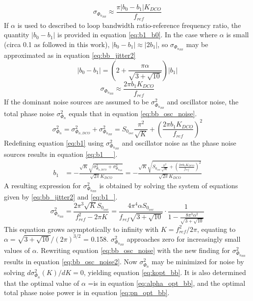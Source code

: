 		\begin{equation}\label{eq:bb_jitter}
			\sigma_{\Phi_{n_{BB}}} \approx \frac{\pi|b_0-b_1|K_{DCO}}{f_{ref}}
		\end{equation}
	If $\alpha$ is used to described to loop bandwidth ratio-reference frequency ratio, the quantity $|b_0-b_1|$ is provided in equation \ref{eq:b1_b0}. In the case where $\alpha$ is small (circa 0.1 as followed in this work), $|b_0-b_1| \approx |2b_1|$, so $\sigma_{\Phi_{n_{BB}}}$ may be approximated as in equation \ref{eq:bb_jitter2}
	\begin{equation}\label{eq:b1_b0}
			|b_0-b_1| = \left(2 + \frac{\pi \alpha}{\sqrt{3+\sqrt{10}}}\right)|b_1|
	\end{equation}
	\begin{equation}\label{eq:bb_jitter2}
		\sigma_{\Phi_{n_{BB}}} \approx \frac{2\pi b_1K_{DCO}}{f_{ref}}
	\end{equation}	
	If the dominant noise sources are assumed to be $\sigma^2_{\Phi_{n_{BB}}}$ and oscillator noise, the total phase noise $\sigma^2_{\Phi_{n}}$ equals that in equation \ref{eq:bb_osc_noise}.
	\begin{equation}\label{eq:bb_osc_noise}
		\sigma_{\Phi_{n}}^2 = \sigma_{\Phi_{n,DCO}}^2 + \sigma^2_{\Phi_{n_{BB}}} = S_{0_{osc}}\frac{\pi^2}{\sqrt{K}} + \left( \frac{2\pi b_1K_{DCO}}{f_{ref}} \right)^2
	\end{equation}
	Redefining equation \ref{eq:b1} using $\sigma^2_{\Phi_{n_{BB}}}$ and oscillator noise as the phase noise sources results in equation \ref{eq:b1__}.
		\begin{align}
			 b_1 &=  - \frac{\sqrt{K}\sqrt{\sigma_{\Phi_{n,DCO}}^2 + \sigma^2_{\Phi_{n_{BB}}} }}{\sqrt{2\pi}K_{DCO}} = - \frac{\sqrt{K}\sqrt{  S_{0_{osc}}\frac{\pi^2}{\sqrt{K}} + \left( \frac{2\pi b_1K_{DCO}}{f_{ref}} \right)^2 }}{\sqrt{2\pi}K_{DCO}}\label{eq:b1__} 
		\end{align}
	A resulting expression for $\sigma^2_{\Phi_{n_{BB}}}$ is obtained by solving the system of equations given by \ref{eq:bb_jitter2} and \ref{eq:b1_}.
	 	\begin{equation}
	 		\sigma^2_{\Phi_{n_{BB}}} = \frac{2\pi^3\sqrt{K}S_{0_{osc}}}{f_{ref}^2  - 2\pi K} = \frac{4\pi^4\alpha S_{0_{osc}}}{f_{ref}\sqrt{3+\sqrt{10}}}\cdot \frac{1}{1-\frac{8\pi^3\alpha^2}{\sqrt{3+\sqrt{10}}}}
	 	\end{equation}
	This equation grows asymptotically to infinity with $K=f_{ref}^2/2\pi$, equating to $\alpha = \sqrt{3+\sqrt{10}}/(2\pi)^{3/2}$  = 0.158. $\sigma^2_{\Phi_{n_{BB}}}$ approaches zero for increasingly small values of $\alpha$. Rewriting equation \ref{eq:bb_osc_noise} with the new finding for $\sigma^2_{\Phi_{n_{BB}}}$ results in equation \ref{eq:bb_osc_noise2}. Now $\sigma_{\Phi_{n}}^2$ may be minimized for noise by solving $d\sigma_{\Phi_{n}}^2(K)/dK =0$, yielding equation \ref{eq:kopt_bb}. It is also determined that the optimal value of $\alpha$ =is in equation \ref{eq:alpha_opt_bb}, and the optimal total phase noise power is in equation \ref{eq:pn_opt_bb}.
